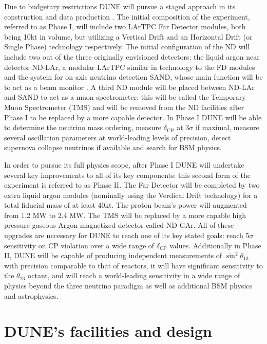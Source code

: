 Due to budgetary restrictions DUNE will pursue a staged approach in its construction and data production \cite{DUNE:2022Snowmass}. The initial composition of the experiment, referred to as Phase I, will include two LArTPC Far Detector modules, both being 10kt in volume, but utilizing a Vertical Drift \cite{DUNE:2023TDRVD} and an Horizontal Drift (or Single Phase) technology \cite{DUNE:2020TDR4} respectively. The initial configuration of the ND will include two out of the three originally envisioned detectors: the liquid argon near detector ND-LAr, a modular LArTPC similar in technology to the FD modules and the system for on axis neutrino detection SAND, whose main function will be to act as a beam monitor \cite{Battisti:2022ND}. A third ND module will be placed between ND-LAr and SAND to act as a muon spectrometer: this will be called the Temporary Muon Spectrometer (TMS) and will be removed from the ND facilities after Phase I to be replaced by a more capable detector. In Phase I DUNE will be able to determine the neutrino mass ordering, measure $\delta_\textrm{CP}$ at 3$\sigma$ if maximal, measure several oscillation parameters at world-leading levels of precision, detect supernova collapse neutrinos if available and search for BSM physics. 

In order to pursue its full physics scope, after Phase I DUNE will undertake several key improvements to all of its key components: this second form of the experiment is referred to as Phase II. The Far Detector will be completed by two extra liquid argon modules (nominally using the Verdical Drift technology) for a total fiducial mass of at least 40kt. The proton beam's power will augmented from 1.2 MW to 2.4 MW. The TMS will be replaced by a more capable high pressure gaseous Argon magnetized detector called ND-GAr. All of these upgrades are necessary for DUNE to reach one of its key stated goals: reach 5$\sigma$ sensitivity on CP violation over a wide range of $\delta_\textrm{CP}$ values. Additionally in Phase II, DUNE will be capable of producing independent measurements of $\sin^2{\theta_{13}}$ with precision comparable to that of reactors, it will have significant sensitivity to the $\theta_{23}$ octant, and will reach a world-leading sensitivity in a wide range of physics beyond the three neutrino paradigm as well as additional BSM physics and astrophysics. 

\section{DUNE's facilities and design}
